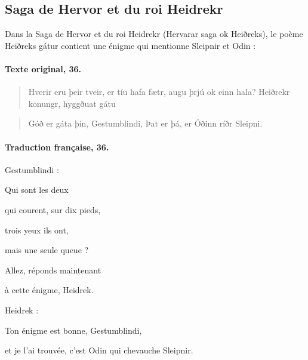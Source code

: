 \documentclass[a4paper, 12pt]{article}
\begin{document}
\subsection{Saga de Hervor et du roi Heidrekr}
Dans la Saga de Hervor et du roi Heidrekr (Hervarar saga ok Heiðreks),
le poème Heiðreks gátur contient une énigme qui mentionne Sleipnir et
Odin :
\begin{multicols}{2}  
  
	\paragraph{Texte original, 36.}
	\begin{dialogue}

    \begin{verse}
    Hverir eru þeir tveir, 
    er tíu hafa fætr, 
    augu þrjú ok einn hala? 
    Heiðrekr konungr, 
    hyggðuat gátu
     \end{verse}
 

    \begin{verse}
    Góð er gáta þín, Gestumblindi, Þat er þá, er Óðinn ríðr Sleipni.
    \end{verse}
  
  \end{dialogue}




  \paragraph{Traduction française, 36.}
  Gestumblindi :

      Qui sont les deux

      qui courent, sur dix pieds,

      trois yeux ils ont,

      mais une seule queue ?

      Allez, réponds maintenant

      à cette énigme, Heidrek.

  Heidrek :

      Ton énigme est bonne, Gestumblindi,

      et je l'ai trouvée, c'est Odin qui chevauche Sleipnir.
\end{multicols}
\tableofcontents



\end{document}

